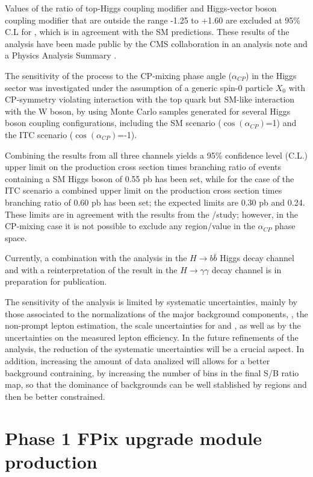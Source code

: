 Values of the ratio of top-Higgs coupling modifier \Ct and Higgs-vector boson coupling modifier \CV that are outside the range -1.25 to +1.60 are excluded at 95\% C.L for , which is in agreement with the SM predictions. These results of the analysis have been made public by the CMS collaboration in an analysis note \cite{CMS_AN_2016-378} and a Physics Analysis Summary \cite{CMS_PAS_HIG_17-005}.

The sensitivity of the \tH process to the CP-mixing phase angle ($\alpha_{CP}$) in the Higgs sector was investigated under the assumption of a generic spin-0 particle $X_0$ with CP-symmetry violating interaction with the top quark but SM-like interaction with the W boson, by using Monte Carlo samples generated for several Higgs boson coupling configurations, including the SM scenario ($\cos(\alpha_{CP})$=1) and the ITC scenario ($\cos (\alpha_{CP})$=-1).  

Combining the results from all three channels yields a 95\% confidence level (C.L.) upper limit on the production cross section times branching ratio of events containing a SM Higgs boson of 0.55 pb has been set, while for the case of the ITC scenario a combined upper limit on the production cross section times branching ratio of 0.60 pb has been set; the expected limits are 0.30 pb and 0.24. These limits are in agreement with the results from the \Ct/\CV study; however, in the CP-mixing case it is not possible to exclude any region/value in the $\alpha_{CP}$ phase space.

Currently, a combination with the \tH analysis in the $H \to b\bar{b}$ Higgs decay channel and with a reinterpretation of the \ttH result in the $H\to \gamma\gamma$ decay channel is in preparation for publication.

The sensitivity of the analysis is limited by systematic uncertainties, mainly by those associated to the normalizations of the major background components, \ie, the non-prompt lepton estimation, the scale uncertainties for \ttW and \ttZ, as well as by the uncertainties on the measured lepton efficiency. In the future refinements of the analysis,  the reduction of the systematic uncertainties will be a crucial aspect. In addition, increasing the amount of data analized will allows for a better background contraining, by increasing the number of bins in the final S/B ratio map, so that the dominance of backgrounds can be well stablished by regions and then be better constrained.       
 
\section{Phase 1 FPix upgrade module production}

